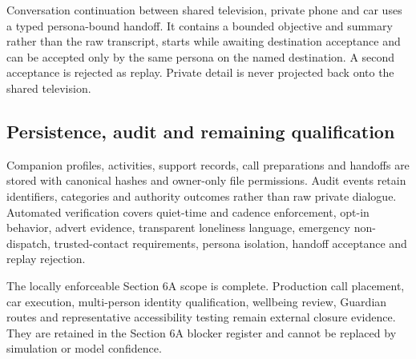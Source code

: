 Conversation continuation between shared television, private phone and car uses a typed
persona-bound handoff.  It contains a bounded objective and summary rather than the raw
transcript, starts while awaiting destination acceptance and can be accepted only by
the same persona on the named destination.  A second acceptance is rejected as replay.
Private detail is never projected back onto the shared television.

\subsection{Persistence, audit and remaining qualification}

Companion profiles, activities, support records, call preparations and handoffs are stored
with canonical hashes and owner-only file permissions.  Audit events retain identifiers,
categories and authority outcomes rather than raw private dialogue.  Automated verification
covers quiet-time and cadence enforcement, opt-in behavior, advert evidence, transparent
loneliness language, emergency non-dispatch, trusted-contact requirements, persona isolation,
handoff acceptance and replay rejection.

The locally enforceable Section 6A scope is complete.  Production call placement, car
execution, multi-person identity qualification, wellbeing review, Guardian routes and
representative accessibility testing remain external closure evidence.  They are retained
in the Section 6A blocker register and cannot be replaced by simulation or model confidence.
